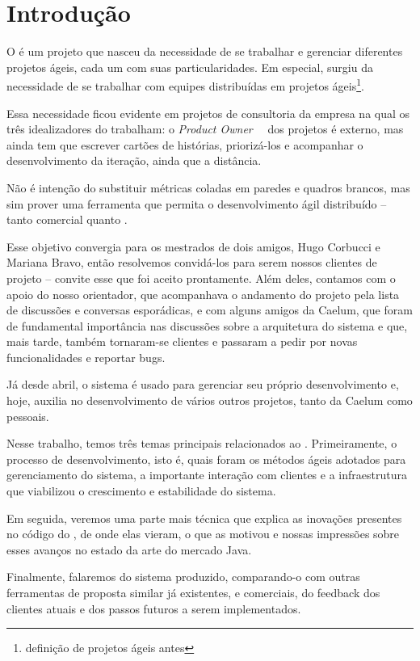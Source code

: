\section{Introdução}
O \calopsita{} é um projeto que nasceu da necessidade de se trabalhar e gerenciar diferentes projetos ágeis, cada um com suas particularidades. Em especial, surgiu da necessidade de se trabalhar com equipes distribuídas em projetos ágeis\footnote{definição de projetos ágeis antes}. 

Essa necessidade ficou evidente em projetos de consultoria da empresa na qual os três idealizadores do \calopsita{} trabalham: o \textit{Product Owner}~\cite{po}~\cite{scrum}
dos projetos é externo, mas ainda tem que escrever cartões de histórias, priorizá-los e acompanhar o desenvolvimento da iteração, ainda que a distância.

Não é intenção do \calopsita{} substituir métricas coladas em paredes e quadros brancos, mas sim prover uma ferramenta que permita o desenvolvimento ágil distribuído -- tanto comercial quanto \opensource.  

Esse objetivo convergia para os mestrados de dois amigos, Hugo Corbucci e Mariana Bravo, então resolvemos convidá-los para serem nossos clientes de projeto -- convite esse que foi aceito prontamente. Além deles, contamos com o apoio do nosso orientador, que acompanhava o andamento do projeto pela lista de discussões e conversas esporádicas, e com alguns amigos da Caelum, que foram de fundamental importância nas discussões sobre a arquitetura do sistema e que, mais tarde, também tornaram-se clientes e passaram a pedir por novas funcionalidades e reportar bugs. 

Já desde abril, o sistema é usado para gerenciar seu próprio desenvolvimento e, hoje, auxilia no desenvolvimento de vários outros projetos, tanto da Caelum como pessoais.

Nesse trabalho, temos três temas principais relacionados ao \calopsita. Primeiramente, o processo de desenvolvimento, isto é, quais foram os métodos ágeis adotados para gerenciamento do sistema, a importante interação com clientes e a infraestrutura que viabilizou o crescimento e estabilidade do sistema. 

Em seguida, veremos uma parte mais técnica que explica as inovações presentes no código do \calopsita, de onde elas vieram, o que as motivou e nossas impressões sobre esses avanços no estado da arte do mercado Java.

Finalmente, falaremos do sistema produzido, comparando-o com outras ferramentas de proposta similar já existentes, \opensource e comerciais, do feedback dos clientes atuais e dos passos futuros a serem implementados.
